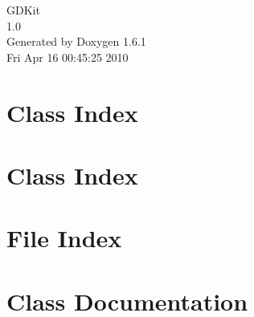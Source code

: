 \documentclass[a4paper]{book}
\begin{document}
\hypersetup{pageanchor=false}
\begin{titlepage}
\vspace*{7cm}
\begin{center}
{\Large GDKit \\[1ex]\large 1.0 }\\
\vspace*{1cm}
{\large Generated by Doxygen 1.6.1}\\
\vspace*{0.5cm}
{\small Fri Apr 16 00:45:25 2010}\\
\end{center}
\end{titlepage}
\clearemptydoublepage
{}
\tableofcontents
\clearemptydoublepage
{}
\hypersetup{pageanchor=true}
\chapter{Class Index}

\chapter{Class Index}

\chapter{File Index}

\chapter{Class Documentation}

































\end{document}
